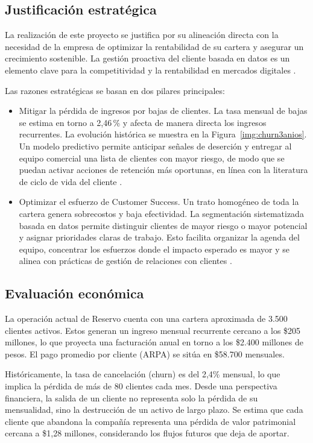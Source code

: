 \subsection{Justificación estratégica}

La realización de este proyecto se justifica por su alineación directa con la necesidad de la empresa de optimizar la rentabilidad de su cartera y asegurar un crecimiento sostenible. La gestión proactiva del cliente basada en datos es un elemento clave para la competitividad y la rentabilidad en mercados digitales \citep{Kumar2010}.

Las razones estratégicas se basan en dos pilares principales:  
\begin{itemize}
    \item Mitigar la pérdida de ingresos por bajas de clientes. La tasa mensual de bajas se estima en torno a 2{,}46\,\% y afecta de manera directa los ingresos recurrentes. La evolución histórica se muestra en la Figura~\ref{img:churn3anios}. Un modelo predictivo permite anticipar señales de deserción y entregar al equipo comercial una lista de clientes con mayor riesgo, de modo que se puedan activar acciones de retención más oportunas, en línea con la literatura de ciclo de vida del cliente \citep{Lemmens2008}.
    
    \item Optimizar el esfuerzo de Customer Success. Un trato homogéneo de toda la cartera genera sobrecostos y baja efectividad. La segmentación sistematizada basada en datos permite distinguir clientes de mayor riesgo o mayor potencial y asignar prioridades claras de trabajo. Esto facilita organizar la agenda del equipo, concentrar los esfuerzos donde el impacto esperado es mayor y se alinea con prácticas de gestión de relaciones con clientes \citep{Kumar2010}.
\end{itemize}

\subsection{Evaluación económica}

La operación actual de Reservo cuenta con una cartera aproximada de 3.500 clientes activos. Estos generan un ingreso mensual recurrente cercano a los \$205 millones, lo que proyecta una facturación anual en torno a los \$2.400 millones de pesos. El pago promedio por cliente (ARPA) se sitúa en \$58.700 mensuales.

Históricamente, la tasa de cancelación (churn) es del 2,4\% mensual, lo que implica la pérdida de más de 80 clientes cada mes. Desde una perspectiva financiera, la salida de un cliente no representa solo la pérdida de su mensualidad, sino la destrucción de un activo de largo plazo. Se estima que cada cliente que abandona la compañía representa una pérdida de valor patrimonial cercana a \$1,28 millones, considerando los flujos futuros que deja de aportar.

